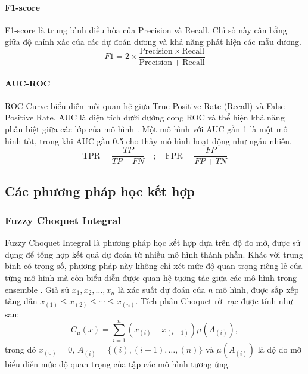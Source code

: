 \documentclass[10pt,twoside]{article}
\begin{document}
\paragraph{F1-score} 
F1-score \cite{grandini_metrics_2020} là trung bình điều hòa của Precision và Recall. Chỉ số này cân bằng giữa độ chính xác của các dự đoán dương và khả năng phát hiện các mẫu dương.
\begin{equation} 
F1=2\times\frac{\mathrm{Precision}\times\mathrm{Recall}}{\mathrm{Precision}+\mathrm{Recall}}
\end{equation}
\paragraph{AUC-ROC} 
ROC Curve biểu diễn mối quan hệ giữa True Positive Rate (Recall) và False Positive Rate. AUC là diện tích dưới đường cong ROC và thể hiện khả năng phân biệt giữa các lớp của mô hình \cite{fawcett_introduction_2006}. Một mô hình với AUC gần 1 là một mô hình tốt, trong khi AUC gần 0.5 cho thấy mô hình hoạt động như ngẫu nhiên.
\begin{equation} 
\mathrm{TPR}=\frac{TP}{TP+FN}\quad;\quad \mathrm{FPR}=\frac{FP}{FP+TN}
\end{equation}

\subsection{Các phương pháp học kết hợp}
\subsubsection{Fuzzy Choquet Integral} Fuzzy Choquet Integral là phương pháp học kết hợp dựa trên độ đo mờ, được sử dụng để tổng hợp kết quả dự đoán từ nhiều mô hình thành phần. Khác với trung bình có trọng số, phương pháp này không chỉ xét mức độ quan trọng riêng lẻ của từng mô hình mà còn biểu diễn được quan hệ tương tác giữa các mô hình trong ensemble \cite{zadeh_fuzzy_1965, choquet_theory_1954}. Giả sử $x_1, x_2, \ldots, x_n$ là xác suất dự đoán của $n$ mô hình, được sắp xếp tăng dần $x_{(1)} \leq x_{(2)} \leq \cdots \leq x_{(n)}$. Tích phân Choquet rời rạc được tính như sau: \begin{equation} C_{\mu}(x) = \sum_{i=1}^{n} \left(x_{(i)} - x_{(i-1)}\right)\mu(A_{(i)}), \end{equation} trong đó $x_{(0)}=0$, $A_{(i)}=\{(i),(i+1),\ldots,(n)\}$ và $\mu(A_{(i)})$ là độ đo mờ biểu diễn mức độ quan trọng của tập các mô hình tương ứng.
\end{document}
